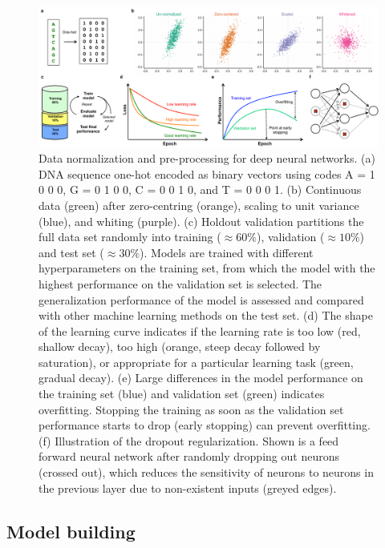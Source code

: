 \begin{figure}[htbp!]
\centering
\includegraphics[width=1.0\textwidth]{tricks}
\caption[Data normalization and pre-processing for deep neural networks.]{Data normalization and pre-processing for deep neural networks. (a) DNA sequence one-hot encoded as binary vectors using codes A = 1 0 0 0, G = 0 1 0 0, C = 0 0 1 0, and T = 0 0 0 1. (b) Continuous data (green) after zero-centring (orange), scaling to unit variance (blue), and whiting (purple). (c) Holdout validation partitions the full data set randomly into training (${\approx}60\%$), validation (${\approx}10\%$) and test set (${\approx}30\%$). Models are trained with different hyperparameters on the training set, from which the model with the highest performance on the validation set is selected. The generalization performance of the model is assessed and compared with other machine learning methods on the test set. (d) The shape of the learning curve indicates if the learning rate is too low (red, shallow decay), too high (orange, steep decay followed by saturation), or appropriate for a particular learning task (green, gradual decay). (e) Large differences in the model performance on the training set (blue) and validation set (green) indicates overfitting. Stopping the training as soon as the validation set performance starts to drop (early stopping) can prevent overfitting. (f) Illustration of the dropout regularization. Shown is a feed forward neural network after randomly dropping out neurons (crossed out), which reduces the sensitivity of neurons to neurons in the previous layer due to non-existent inputs (greyed edges).}
\label{fig:dl_tricks}
\end{figure}


\subsection{Model building}

